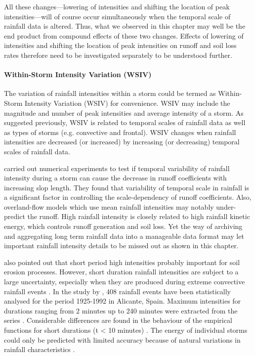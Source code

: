 All these changes---lowering of intensities and shifting the location of peak
intensities---will of course occur simultaneously when the temporal scale of
rainfall data is altered. Thus, what we observed in this chapter may well be the
end product from compound effects of these two changes. Effects of lowering of
intensities and shifting the location of peak intensities on runoff and
soil loss rates therefore need to be investigated separately to be understood
further.

\paragraph{Within-Storm Intensity Variation (WSIV)} The variation of rainfall
intensities within a storm could be termed as Within-Storm Intensity Variation
(WSIV) for convenience. WSIV may include the magnitude and number of peak
intensities and average intensity of a storm. As suggested previously, WSIV is
related to temporal scales of rainfall data as well as types of storms (e.g.
convective and frontal). WSIV changes when rainfall intensities are decreased
(or increased) by increasing (or decreasing) temporal scales of rainfall data.

\citet{wainwright2002-1271} carried out numerical experiments to test if
temporal variability of rainfall intensity during a storm can cause the decrease
in runoff coefficients with increasing slop length. They found that variability
of temporal scale in rainfall is a significant factor in controlling the
scale-dependency of runoff coefficients. Also, overland-flow models which use
mean rainfall intensities may notably under-predict the runoff.
High rainfall intensity is closely related to high rainfall kinetic energy,
which controls runoff generation and soil loss. Yet the way of archiving and
aggregating long term rainfall data into a manageable data format may let
important rainfall intensity details to be missed out as shown in this chapter.

\citet{boardman1987-36} also pointed out that
short period high intensities probably important for soil erosion processes.
However, short duration rainfall intensities are subject to a large uncertainty,
especially when they are produced during extreme convective rainfall events
\citep{garcia2001-675}. In the study by \citet{garcia2001-675}, 408 rainfall
events have been statistically analysed for the period 1925-1992 in Alicante,
Spain. Maximum intensities for durations ranging from 2 minutes up to 240
minutes were extracted from the series \citep{garcia2001-675}. Considerable
differences are found in the behaviour of the empirical functions for short
durations (t < 10 minutes) \citep{garcia2001-675}. The energy of individual
storms could only be predicted with limited accuracy because of natural
variations in rainfall characteristics \citep{vandijk2002-1}.

